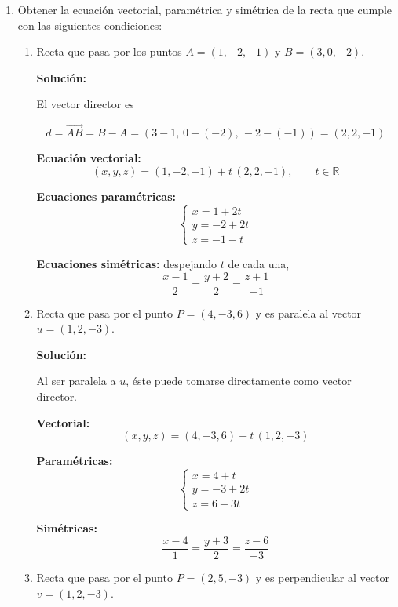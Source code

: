 \documentclass[12pt]{article}
\newcommand{\solucion}{%
    \vspace{0.8em}%
    \textbf{Solución:}%
    \vspace{0.8em}%
}
\begin{document}
\begin{enumerate}[label=\alph*.-]

    \item Obtener la ecuación vectorial, paramétrica y simétrica de la recta
    que cumple con las siguientes condiciones:

    \begin{enumerate}[label=\roman*)]

        \item Recta que pasa por los puntos $A=(1,-2,-1)$ y $B=(3,0,-2)$.

        \solucion

        El vector director es

        \[
        d=\overrightarrow{AB}=B-A=(3-1,\,0-(-2),\,-2-(-1))=(2,2,-1)
        \]

        \textbf{Ecuación vectorial:}
        \[
        (x,y,z)=(1,-2,-1)+t\,(2,2,-1),\qquad t\in\mathbb{R}
        \]

        \textbf{Ecuaciones paramétricas:}
        \[
        \begin{cases}
        x=1+2t\\
        y=-2+2t\\
        z=-1-t
        \end{cases}
        \]

        \textbf{Ecuaciones simétricas:} despejando $t$ de cada una,
        \[
        \boxed{\frac{x-1}{2}=\frac{y+2}{2}=\frac{z+1}{-1}}
        \]

        \item Recta que pasa por el punto $P=(4,-3,6)$ y es paralela al
        vector $u=(1,2,-3)$.

        \solucion

        Al ser paralela a $u$, éste puede tomarse directamente como vector
        director.

        \textbf{Vectorial:}
        \[
        (x,y,z)=(4,-3,6)+t\,(1,2,-3)
        \]

        \textbf{Paramétricas:}
        \[
        \begin{cases}
        x=4+t\\
        y=-3+2t\\
        z=6-3t
        \end{cases}
        \]

        \textbf{Simétricas:}
        \[
        \boxed{\frac{x-4}{1}=\frac{y+3}{2}=\frac{z-6}{-3}}
        \]

        \item Recta que pasa por el punto $P=(2,5,-3)$ y es perpendicular al
        vector $v=(1,2,-3)$.


\end{enumerate}
\end{enumerate}
\end{document}
